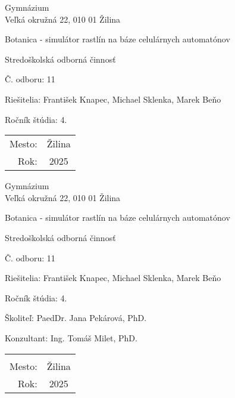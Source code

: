 \documentclass[12pt]{article}
\def\nazovprace{Botanica - simulátor rastlín na báze celulárnych automatónov}
\def\autori{František Knapec, Michael Sklenka, Marek Beňo}
\begin{document}
\begin{titlepage}
	\setlength{\parindent}{0pt}

	\begin{center}
		Gymnázium \\
		Veľká okružná 22, 010 01 Žilina

		\vspace{7cm}
		\Huge \nazovprace

		\vspace{1.13cm}
		\Large Stredoškolská odborná činnosť

		\vspace{2.12cm}
		\normalsize Č. odboru: 11
	\end{center}

	\vfill

	\begin{minipage}{0.75\textwidth}
		Riešitelia: \autori \par
		Ročník štúdia: 4.
	\end{minipage}
	\hfill
	\begin{minipage}{0.23\textwidth}
		\hfil %
		\begin{tabular}{rc}
			Mesto: & Žilina \\
			Rok:   & 2025
		\end{tabular}
	\end{minipage}
\end{titlepage}

\begin{titlepage}
	\setlength{\parindent}{0pt}

	\begin{center}
		Gymnázium \\
		Veľká okružná 22, 010 01 Žilina

		\vspace{7cm}
		\Huge \nazovprace

		\vspace{1.13cm}
		\Large Stredoškolská odborná činnosť

		\vspace{2.12cm}
		\normalsize Č. odboru: 11
	\end{center}

	\vfill

	\begin{minipage}{0.75\textwidth}
		Riešitelia: \autori \par
		Ročník štúdia: 4. \par
		Školiteľ: PaedDr. Jana Pekárová, PhD.\par
		Konzultant: Ing. Tomáš Milet, PhD.
	\end{minipage}
	\hfill
	\begin{minipage}{0.23\textwidth}
		\hfil %
		\begin{tabular}{rc}
			\\ \\
			Mesto: & Žilina \\
			Rok:   & 2025
		\end{tabular}
	\end{minipage}
\end{titlepage}
\end{document}
